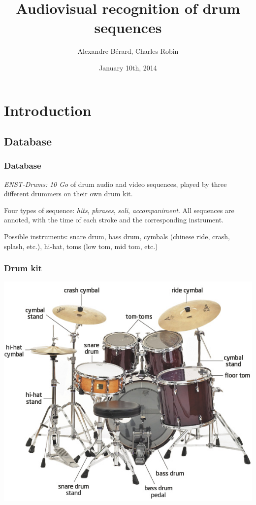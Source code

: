 \documentclass{beamer}
\title[Audiovisual recognition of drum sequences]{Audiovisual recognition of drum sequences}
\author[A.~Bérard, C.~Robin]{Alexandre Bérard, Charles Robin}
\date{January 10th, 2014}
\begin{document}
    \begin{frame}
    \titlepage
    \end{frame}

    \section{Introduction}    
    \subsection{Database}
    \begin{frame}
        \frametitle{Database}
        \emph{ENST-Drums:} \emph{10 Go} of drum audio and video sequences, played by three different drummers on their own drum kit.
        \vspace*{0.5cm}
       
        Four types of sequence: \emph{hits}, \emph{phrases}, \emph{soli}, \emph{accompaniment}. All sequences are annoted, with the time of each stroke and the corresponding instrument.
        \vspace*{0.5cm}

        Possible instruments: snare drum, bass drum, cymbals (chinese ride, crash, splash, etc.), hi-hat, toms (low tom, mid tom, etc.)
    \end{frame}
    
    \begin{frame}
        \frametitle{Drum kit}
        \begin{center}
            \includegraphics[scale=0.35]{drum-kit.jpg}
        \end{center}
    \end{frame}
\end{document}
